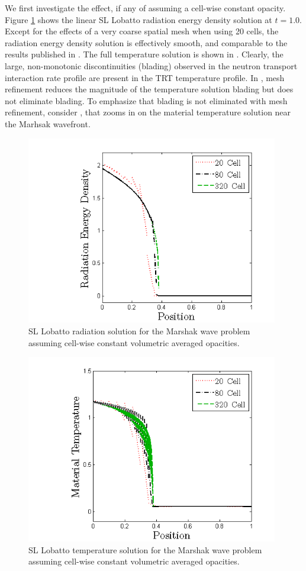 We first investigate the effect, if any of assuming a cell-wise constant opacity.  Figure \ref{fig:bladed_rad_profile} shows the linear SL Lobatto radiation energy density solution at $t=1.0$.
Except for the effects of a very coarse spatial mesh when using 20 cells, the radiation energy density solution is effectively smooth, and comparable to the results published in \cite{ober_shadid}.  
The full temperature solution is shown in .
Clearly, the large, non-monotonic discontinuities (blading) observed in the neutron transport interaction rate profile are present in the TRT temperature profile.
In , mesh refinement reduces the magnitude of the temperature solution blading but does not eliminate blading.
To emphasize that blading is not eliminated with mesh refinement, consider , that zooms in on the material temperature solution near the Marhsak wavefront.
\begin{figure}[!htp]
\centering
\includegraphics[width=11cm]{chapter6_grey_radtran/Dissertation_Data/Blading_Radiation_Full_MultiCell.png}
\caption{SL Lobatto radiation solution for the Marshak wave problem assuming cell-wise constant volumetric averaged opacities.}
\label{fig:bladed_rad_profile}
\end{figure}
%
%
\begin{figure}[!hbp]
\centering
\includegraphics[width=11cm]{chapter6_grey_radtran/Dissertation_Data/Blading_Temperature_Full_MultiCell.png}
\caption{SL Lobatto temperature solution for the Marshak wave problem assuming cell-wise constant volumetric averaged opacities.}
\label{fig:bladed_t_profile_full}
\end{figure}
